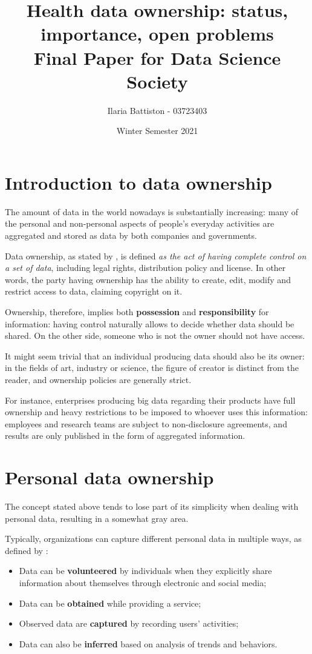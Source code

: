 \documentclass[12pt]{article}
\title{\textbf{Health data ownership: status, importance, open problems}  \\[0.9em] \smaller{} Final Paper for Data Science Society}
\author{Ilaria Battiston - 03723403}
\date{Winter Semester 2021}
\begin{document}
	
	\maketitle
	
	\lfoot{}
	\cfoot{}
	\rfoot{\thepage}
	
	\newpage
	\setcounter{tocdepth}{2}
	\tableofcontents
	\newpage

	\section{Introduction to data ownership}
	The amount of data in the world nowadays is substantially  increasing: many of the personal and non-personal aspects  of people's everyday activities are aggregated and stored as   data by both companies and governments.
	
	Data ownership, as stated by \cite{techopedia}, is defined \textit{as the act of having complete control on a set of data}, including legal rights, distribution policy and license. In other words, the party having ownership has the ability to create, edit, modify and restrict access to data, claiming copyright on it.
	
	Ownership, therefore, implies both \textbf{possession} and \textbf{responsibility} for information: having control naturally allows to decide whether data should be shared. On the other side, someone who is not the owner should not have access.
	
	It might seem trivial that an individual producing data should also be its owner: in the fields of art, industry or science, the figure of creator is distinct from the reader, and ownership policies are generally strict. 
	
	For instance, enterprises producing big data regarding their products have full ownership and heavy restrictions to be imposed to whoever uses this information: employees and research teams are subject to non-disclosure agreements, and results are only published in the form of aggregated information.
	
	\section{Personal data ownership}
	The concept stated above tends to lose part of its simplicity when dealing with personal data, resulting in a somewhat gray area.
	
	Typically, organizations can capture different personal data  in multiple ways, as defined by \cite{khouri}:
	\begin{itemize}
		\item Data can be \textbf{volunteered} by individuals when they explicitly share information about themselves through electronic and social media;
		\item Data can be \textbf{obtained} while providing a service;
		\item Observed data are \textbf{captured} by recording users’  activities;
		\item Data can also be \textbf{inferred} based on analysis of trends and behaviors.
	\end{itemize}
\end{document}
